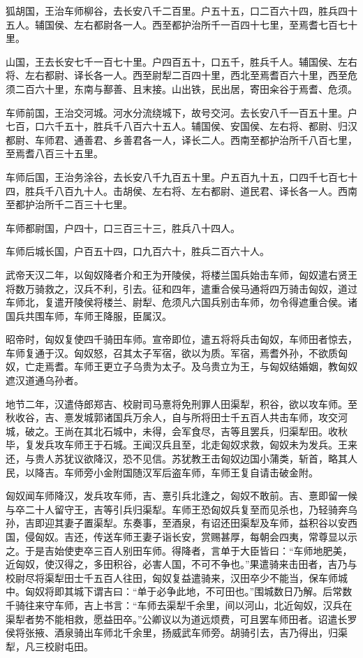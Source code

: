 \documentclass[]{article}
\begin{document}
狐胡国，王治车师柳谷，去长安八千二百里。户五十五，口二百六十四，胜兵四十五人。辅国侯、左右都尉各一人。西至都护治所千一百四十七里，至焉耆七百七十里。

山国，王去长安七千一百七十里。户四百五十，口五千，胜兵千人。辅国侯、左右将、左右都尉、译长各一人。西至尉犁二百四十里，西北至焉耆百六十里，西至危须二百六十里，东南与鄯善、且末接。山出铁，民出居，寄田籴谷于焉耆、危须。

车师前国，王治交河城。河水分流绕城下，故号交河。去长安八千一百五十里。户七百，口六千五十，胜兵千八百六十五人。辅国侯、安国侯、左右将、都尉、归汉都尉、车师君、通善君、乡善君各一人，译长二人。西南至都护治所千八百七里，至焉耆八百三十五里。

车师后国，王治务涂谷，去长安八千九百五十里。户五百九十五，口四千七百七十四，胜兵千八百九十人。击胡侯、左右将、左右都尉、道民君、译长各一人。西南至都护治所千二百三十七里。

车师都尉国，户四十，口三百三十三，胜兵八十四人。

车师后城长国，户百五十四，口九百六十，胜兵二百六十人。

武帝天汉二年，以匈奴降者介和王为开陵侯，将楼兰国兵始击车师，匈奴遣右贤王将数万骑救之，汉兵不利，引去。征和四年，遣重合侯马通将四万骑击匈奴，道过车师北，复遣开陵侯将楼兰、尉犁、危须凡六国兵别击车师，勿令得遮重合侯。诸国兵共围车师，车师王降服，臣属汉。

昭帝时，匈奴复使四千骑田车师。宣帝即位，遣五将将兵击匈奴，车师田者惊去，车师复通于汉。匈奴怒，召其太子军宿，欲以为质。军宿，焉耆外孙，不欲质匈奴，亡走焉耆。车师王更立子乌贵为太子。及乌贵立为王，与匈奴结婚姻，教匈奴遮汉道通乌孙者。

地节二年，汉遣侍郎郑吉、校尉司马憙将免刑罪人田渠犁，积谷，欲以攻车师。至秋收谷，吉、憙发城郭诸国兵万余人，自与所将田士千五百人共击车师，攻交河城，破之。王尚在其北石城中，未得，会军食尽，吉等且罢兵，归渠犁田。收秋毕，复发兵攻车师王于石城。王闻汉兵且至，北走匈奴求救，匈奴未为发兵。王来还，与贵人苏犹议欲降汉，恐不见信。苏犹教王击匈奴边国小蒲类，斩首，略其人民，以降吉。车师旁小金附国随汉军后盗车师，车师王复自请击破金附。

匈奴闻车师降汉，发兵攻车师，吉、憙引兵北逢之，匈奴不敢前。吉、憙即留一候与卒二十人留守王，吉等引兵归渠犁。车师王恐匈奴兵复至而见杀也，乃轻骑奔乌孙，吉即迎其妻子置渠犁。东奏事，至酒泉，有诏还田渠犁及车师，益积谷以安西国，侵匈奴。吉还，传送车师王妻子诣长安，赏赐甚厚，每朝会四夷，常尊显以示之。于是吉始使吏卒三百人别田车师。得降者，言单于大臣皆曰：``车师地肥美，近匈奴，使汉得之，多田积谷，必害人国，不可不争也。''果遣骑来击田者，吉乃与校尉尽将渠犁田士千五百人往田，匈奴复益遣骑来，汉田卒少不能当，保车师城中。匈奴将即其城下谓吉曰：``单于必争此地，不可田也。''围城数日乃解。后常数千骑往来守车师，吉上书言：``车师去渠犁千余里，间以河山，北近匈奴，汉兵在渠犁者势不能相救，愿益田卒。''公卿议以为道远烦费，可且罢车师田者。诏遣长罗侯将张掖、酒泉骑出车师北千余里，扬威武车师旁。胡骑引去，吉乃得出，归渠犁，凡三校尉屯田。
\end{document}
